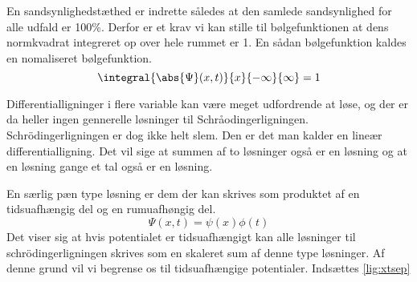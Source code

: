En sandsynlighedstæthed er indrette således at den samlede sandsynlighed for alle udfald er 100\%. Derfor er et krav vi kan stille til bølgefunktionen at dens normkvadrat integreret op over hele rummet er 1. En sådan bølgefunktion kaldes en nomaliseret bølgefunktion. 
\begin{equation}
\integral{\abs{\Psi}(x,t)}{x}{-\infty}{\infty} = 1
\end{equation}


Differentialligninger i flere variable kan være meget udfordrende at løse, og der er da heller ingen gennerelle løsninger til Schråodingerligningen. Schrödingerligningen er dog ikke helt slem. Den er det man kalder en lineær differentialligning. Det vil sige at summen af to løsninger også er en løsning og at en løsning gange et tal også er en løsning.

En særlig pæn type løsning er dem der kan skrives som produktet af en tidsuafhængig del og en rumuafhøngig del.
\begin{equation}
\Psi(x,t) = \psi(x)\phi(t)
\label{lig:xtsep}
\end{equation}
Det viser sig at hvis potentialet er tidsuafhængigt kan alle løsninger til schrödingerligningen skrives som en skaleret sum af denne type løsninger. Af denne grund vil vi begrense os til tidsuafhængige potentialer.
Indsættes \eqref{lig:xtsep}
